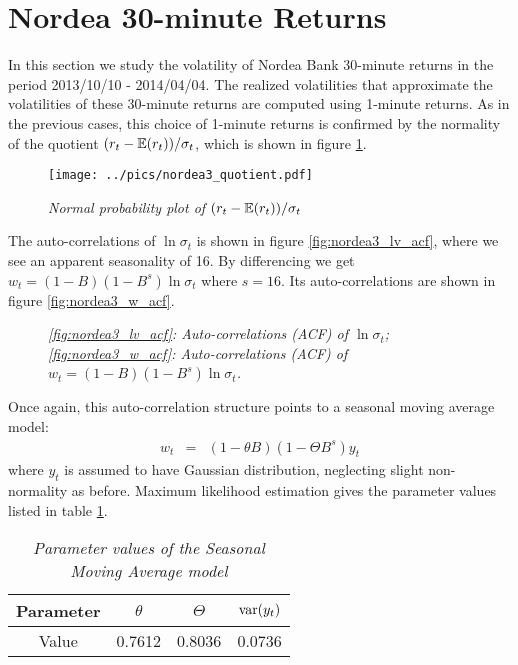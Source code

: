 \section{Nordea 30-minute Returns}
\label{sec:nordea2_30min}
In this section we study the volatility of Nordea Bank 30-minute
returns in the period 2013/10/10 - 2014/04/04. The realized
volatilities that approximate the volatilities of these 30-minute
returns are computed using 1-minute returns. As in the previous cases,
this choice of 1-minute returns is confirmed by the normality of the
quotient $(r_t - \mathbb{E}(r_t))/\sigma_t$, which is shown in figure
\ref{fig:nordea3_quotient}.
\begin{figure}[htb!]
  \centering
  \texttt{[image: ../pics/nordea3\_quotient.pdf]}
  \caption{\small \it Normal probability plot of $(r_t -
    \mathbb{E}(r_t))/\sigma_t$}
  \label{fig:nordea3_quotient}
\end{figure}
The auto-correlations of $\ln \sigma_t$ is shown in figure
\ref{fig:nordea3_lv_acf}, where we see an apparent seasonality of
16. By differencing we get $w_t = (1-B)(1-B^s)\ln\sigma_t$ where
$s=16$. Its auto-correlations are shown in figure
\ref{fig:nordea3_w_acf}.
\begin{figure}[htb!]
  \centering
  \caption{\small \it \ref{fig:nordea3_lv_acf}: Auto-correlations
    (ACF) of $\ln \sigma_t$; \ref{fig:nordea3_w_acf}: Auto-correlations
    (ACF) of $w_t = (1-B)(1-B^s)\ln\sigma_t$.}
\end{figure}
Once again, this auto-correlation structure
points to a seasonal moving average model:
\begin{eqnarray*}
  w_t &=& (1-\theta B)(1-\Theta B^s) y_t
\end{eqnarray*}
where $y_t$ is assumed to have Gaussian distribution, neglecting
slight non-normality as before. Maximum likelihood estimation gives
the parameter values listed in table \ref{tab:nordea3_sv_param}.
\begin{table}[htb!]
  \centering
  \begin{tabular}{|c|c|c|c|}
    \hline
    Parameter & $\theta$ & $\Theta$ & $\text{var}(y_t)$\\
    \hline
    Value & 0.7612 & 0.8036 & 0.0736\\
    \hline
  \end{tabular}
  \caption{\small \it Parameter values of the Seasonal Moving Average
    model}
  \label{tab:nordea3_sv_param}
\end{table}
